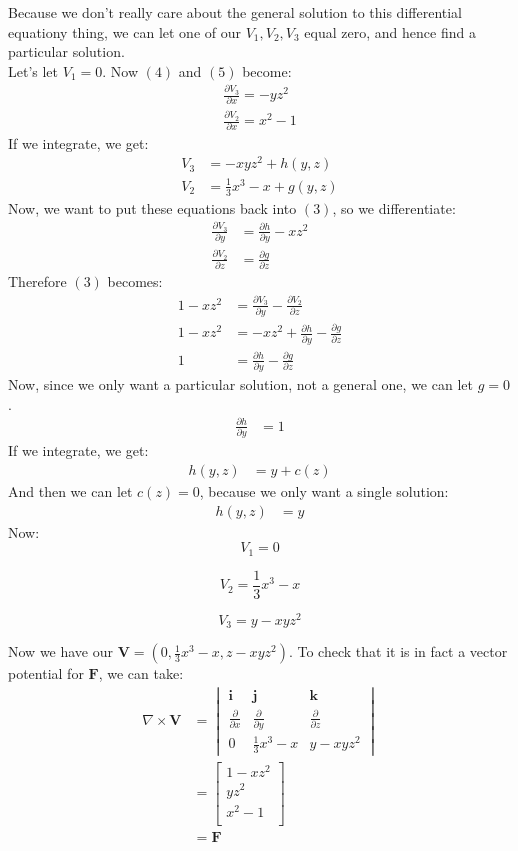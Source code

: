 \documentclass[12pt]{article}
\newcommand{\vect}[1]{\boldsymbol{#1}}
\begin{document}
Because we don't really care about the general solution to this differential equationy thing, we can let one of our $V_1, V_2, V_3$ equal zero, and hence find a particular solution.\\
\medskip
Let's let $V_1=0$. Now $(4)$ and $(5)$ become:\\
\begin{align*}
	\frac{\partial V_3}{\partial x} = -yz^2 \\
	\frac{\partial V_2}{\partial x} = x^2-1 
\end{align*}
If we integrate, we get:
\begin{align*}
	V_3 &= -xyz^2 + h(y,z) \\
	V_2 &= \frac{1}{3}x^3-x + g(y,z)
\end{align*}
Now, we want to put these equations back into $(3)$, so we differentiate:
\begin{align*}
	\frac{\partial V_3}{\partial y} &= \frac{\partial h}{\partial y} -xz^2 \\
	\frac{\partial V_2}{\partial z} &= \frac{\partial g}{\partial z}
\end{align*}
Therefore $(3)$ becomes:
\begin{align*}
	1-xz^2 &= \frac{\partial V_3}{\partial y} - \frac{\partial V_2}{\partial z} \\
	1-xz^2 &= -xz^2 + \frac{\partial h}{\partial y} - \frac{\partial g}{\partial z}\\
	1 &= \frac{\partial h}{\partial y} - \frac{\partial g}{\partial z}
\end{align*}
Now, since we only want a particular solution, not a general one, we can let $g = 0$.\\
\begin{align*}
	\frac{\partial h}{\partial y} &= 1
\end{align*}
If we integrate, we get:
\begin{align*}
	h(y, z) &= y + c(z)
\end{align*}
And then we can let $c(z) = 0$, because we only want a single solution:
\begin{align*}
	h(y, z) &= y
\end{align*}
Now:
$$
V_1 = 0
$$

$$
V_2 = \frac{1}{3}x^3-x
$$

$$
V_3 = y-xyz^2
$$

Now we have our $\vect{V}=\left(0, \frac{1}{3}x^3-x, z-xyz^2 \right)$. To check that it is in fact a vector potential for $\vect{F}$, we can take:
\begin{align*}
\nabla \times \vect{V} &=
\begin{vmatrix}
	\vect{i} & \vect{j} & \vect{k} \\
	\frac{\partial}{\partial x} & \frac{\partial}{\partial y} & \frac{\partial}{\partial z} \\
	0 & \frac{1}{3}x^3-x & y-xyz^2
\end{vmatrix} \\
&=\begin{bmatrix}
	1-xz^2 \\
	yz^2 \\
	x^2-1 \\
\end{bmatrix} \\
&=\vect{F}
\end{align*}
\end{document}
